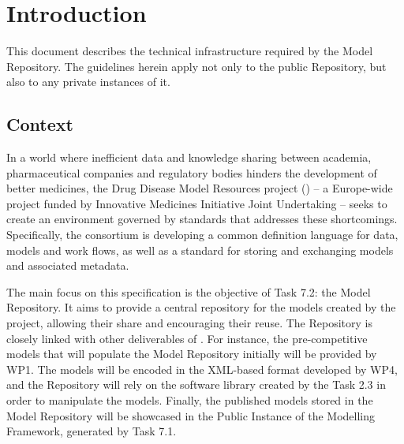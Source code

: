 \section{Introduction}
\label{introduction}
This document describes the technical infrastructure required by the \ddmore Model Repository. The guidelines herein apply not only to the public Repository, but also to any private instances of it.

\subsection{Context}
\label{context}
In a world where inefficient data and knowledge sharing between academia, pharmaceutical companies and regulatory bodies hinders the development of better medicines, the Drug Disease Model Resources project (\ddmore) -- a Europe-wide project funded by Innovative Medicines Initiative Joint Undertaking -- seeks to create an environment governed by standards that addresses these shortcomings. Specifically, the \ddmore consortium is developing a common definition language for data, models and work flows, as well as a standard for storing and exchanging \glspl{model} and associated \gls{metadata}\cite{ddmore:dow}.

The main focus on this specification is the objective of Task 7.2: the \ddmore Model Repository. It aims to provide a central repository for the models created by the project, allowing their share and encouraging their reuse. The Repository is closely linked with other deliverables of \ddmore. For instance, the pre-competitive models that will populate the Model Repository initially will be provided by WP1. The models will be encoded in the XML-based format developed by WP4, and the Repository will rely on the software library created by the Task 2.3 in order to manipulate the models. Finally, the published models stored in the \ddmore Model Repository will be showcased in the Public Instance of the Modelling Framework, generated by Task 7.1.


